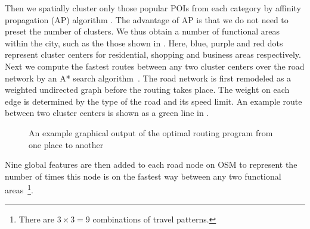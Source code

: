 Then we spatially cluster only those popular POIs from each category
by affinity propagation (AP) algorithm \cite{frey07affinitypropagation}.
The advantage of AP is that we do not need to preset the number 
of clusters. We thus obtain a number of functional areas within 
the city, such as the those shown in . Here,
blue, purple and red dots represent cluster centers for
residential, shopping and business areas respectively.
Next we compute the fastest routes between any two cluster centers 
over the road network by an A* search algorithm~\cite{4082128}. 
The road network is first remodeled as a 
weighted undirected graph before the routing takes place. 
The weight on each edge is determined by the type of the road 
and its speed limit. An example route 
between two cluster centers is shown as a green line 
in .

\begin{figure}
	\centering
	\caption{An example graphical output of the optimal routing program from one place to another}
	\label{fig:routing}
\end{figure}

Nine global features are then added to each road node on OSM to represent 
the number of times this node is on the fastest way between any two functional
areas~\footnote{There are $3\times3 = 9$ combinations of travel patterns.}.



